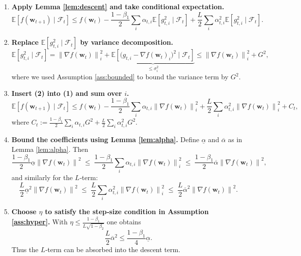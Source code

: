 \documentclass[11pt]{article}
\newcommand{\EE}{\mathbb{E}}
\newcommand{\norm}[1]{\left\lVert #1 \right\rVert}
\begin{document}
\begin{enumerate}[label=[Step \arabic*],leftmargin=*,align=left]
\item \textbf{Apply Lemma \ref{lem:descent} and take conditional expectation.}
\[
\EE\!\left[f(\bm{w}_{t+1})\mid\mathcal{F}_t\right]
\le f(\bm{w}_t)-\frac{1-\beta_1}{2}\sum_{i}\alpha_{t,i}\EE\!\left[g_{t,i}^{2}\mid\mathcal{F}_t\right]
   +\frac{L}{2}\sum_{i}\alpha_{t,i}^{2}\EE\!\left[g_{t,i}^{2}\mid\mathcal{F}_t\right].
\tag{1}
\]

\item \textbf{Replace $\EE[g_{t,i}^{2}\mid\mathcal{F}_t]$ by variance decomposition.}
\[
\EE\!\left[g_{t,i}^{2}\mid\mathcal{F}_t\right]
= \norm{\nabla f(\bm{w}_t)}^{2}_{i} + \underbrace{
   \EE\!\left[\bigl(g_{t,i}-\nabla f(\bm{w}_t)_i\bigr)^{2}\mid\mathcal{F}_t\right]}_{\le\sigma^{2}_i}
\le \norm{\nabla f(\bm{w}_t)}^{2}_{i}+G^{2},
\tag{2}
\]
where we used Assumption \ref{ass:bounded} to bound the variance term by $G^{2}$.

\item \textbf{Insert (2) into (1) and sum over $i$.}
\[
\EE\!\left[f(\bm{w}_{t+1})\mid\mathcal{F}_t\right]
\le f(\bm{w}_t)-\frac{1-\beta_1}{2}\sum_{i}\alpha_{t,i}
   \norm{\nabla f(\bm{w}_t)}^{2}_{i}
   +\frac{L}{2}\sum_{i}\alpha_{t,i}^{2}\norm{\nabla f(\bm{w}_t)}^{2}_{i}
   +C_t,
\tag{3}
\]
where $C_t:=\frac{1-\beta_1}{2}\sum_{i}\alpha_{t,i}G^{2}
        +\frac{L}{2}\sum_{i}\alpha_{t,i}^{2}G^{2}$.

\item \textbf{Bound the coefficients using Lemma \ref{lem:alpha}.}
Define $\underline{\alpha}$ and $\overline{\alpha}$ as in Lemma \ref{lem:alpha}.
Then
\[
\frac{1-\beta_1}{2}\underline{\alpha}\norm{\nabla f(\bm{w}_t)}^{2}
\;\le\;\frac{1-\beta_1}{2}\sum_{i}\alpha_{t,i}\norm{\nabla f(\bm{w}_t)}^{2}_{i}
\;\le\;\frac{1-\beta_1}{2}\overline{\alpha}\norm{\nabla f(\bm{w}_t)}^{2},
\]
and similarly for the $L$‑term:
\[
\frac{L}{2}\underline{\alpha}^{2}\norm{\nabla f(\bm{w}_t)}^{2}
\;\le\;\frac{L}{2}\sum_{i}\alpha_{t,i}^{2}\norm{\nabla f(\bm{w}_t)}^{2}_{i}
\;\le\;\frac{L}{2}\overline{\alpha}^{2}\norm{\nabla f(\bm{w}_t)}^{2}.
\tag{4}
\]

\item \textbf{Choose $\eta$ to satisfy the step‑size condition in Assumption \ref{ass:hyper}.}
With $\eta\le\frac{1-\beta_1}{L\sqrt{1-\beta_2}}$ one obtains
\[
\frac{L}{2}\overline{\alpha}^{2}\le \frac{1-\beta_1}{4}\underline{\alpha}.
\tag{5}
\]
Thus the $L$‑term can be absorbed into the descent term.


\end{enumerate}
\end{document}
